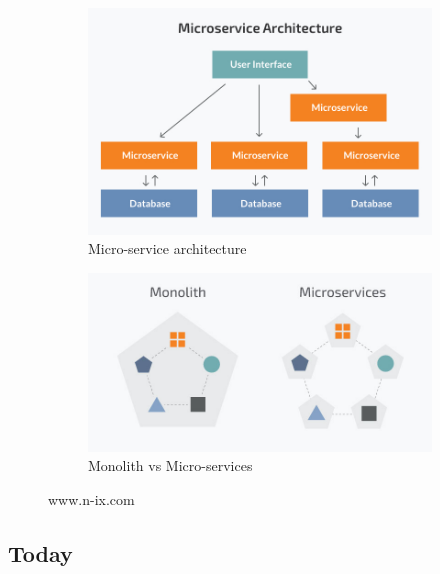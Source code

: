 \begin{figure}[H]
    \centering
    \begin{subfigure}[a]{0.45\textwidth}
        \includegraphics[width=\textwidth]{figures/micro.jpg}
        \caption{Micro-service architecture}
        \label{fig:micro}
    \end{subfigure}
    \hfill
    \begin{subfigure}[b]{0.54\textwidth}
        \includegraphics[width=\textwidth]{figures/micro vs mono.jpg}
        \caption{Monolith vs Micro-services}
        \label{fig:mono-vs-micro}
    \end{subfigure}
    \caption{\label{fig:mono-micro}www.n-ix.com~\cite{monoVsMicro}}
\end{figure}

\subsection{Today}


